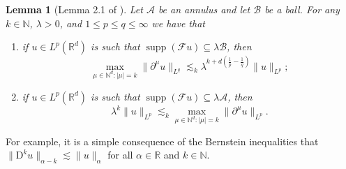 \documentclass[a4paper,11pt]{article}
\newcommand{\mathD}{\mathrm{D}}
\newcommand{\tmop}[1]{\ensuremath{\operatorname{#1}}}
\newenvironment{enumeratenumeric}{\begin{enumerate}[1.] }{\end{enumerate}}
\newtheorem{lemma}[theorem]{Lemma}
\theoremstyle{remark}
\newcommand{\R}{\mathbb{R}}
\newcommand{\N}{\mathbb{N}}
\newcommand{\CA}{\ensuremath{\mathscr{A}}}
\newcommand{\CB}{\ensuremath{\mathscr{B}}}
\newcommand{\CF}{\ensuremath{\mathscr{F}}}
\begin{document}
\begin{lemma}[Lemma 2.1 of {\cite{Bahouri2011}}]\label{lemma:Bernstein}
   Let $\CA$ be an annulus and let $\CB$ be a ball. For any $k \in \mathbb{N}$, $\lambda >0$, and $1 \leqslant p \leqslant q \leqslant \infty$ we have that
   \begin{enumeratenumeric}
      \item if $u \in L^{p} ( \mathbb{R}^{d} )$ is such that $\tmop{supp} ( \CF u ) \subseteq \lambda \CB$, then
         \[
            \max_{\mu \in \mathbb{N}^{d} : | \mu | = k} \| \partial^{\mu} u \|_{L^{q}} \lesssim_{k} \lambda^{k+d \left( \frac{1}{p} - \frac{1}{q} \right)} \| u \|_{L^{p}};
         \]
      \item if $u \in L^{p} ( \mathbb{R}^{d} )$ is such that $\tmop{supp} (\CF u ) \subseteq \lambda \CA$, then
         \[
            \lambda^{k} \| u \|_{L^{p}} \lesssim_{k} \max_{\mu \in \mathbb{N}^{d}: | \mu | = k} \| \partial^{\mu} u \|_{L^{p}} .
         \]
  \end{enumeratenumeric}
\end{lemma}

For example, it is a simple consequence of the Bernstein inequalities that $\| \mathD^k u \|_{\alpha-k} \lesssim \| u \|_\alpha$ for all $\alpha \in \R$ and $k \in \N$.
\end{document}
